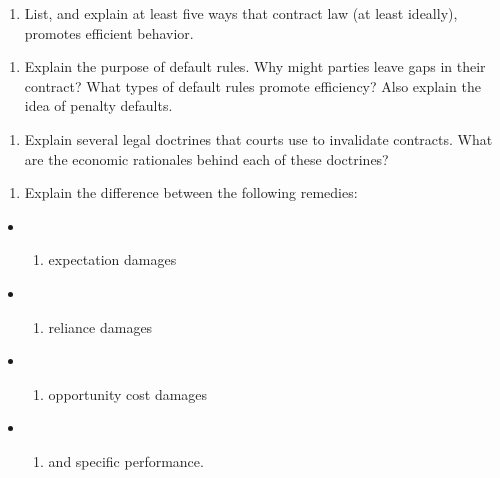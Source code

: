 \documentclass[
  11pt,
]{article}
\providecommand{\tightlist}{%
  \setlength{\itemsep}{0pt}\setlength{\parskip}{0pt}}
\begin{document}
\vspace{3in}

\begin{enumerate}
\def\labelenumi{\arabic{enumi}.}
\setcounter{enumi}{1}
\tightlist
\item
  List, and explain at least five ways that contract law (at least
  ideally), promotes efficient behavior.
\end{enumerate}

\clearpage

\begin{enumerate}
\def\labelenumi{\arabic{enumi}.}
\setcounter{enumi}{2}
\tightlist
\item
  Explain the purpose of default rules. Why might parties leave gaps in
  their contract? What types of default rules promote efficiency? Also
  explain the idea of penalty defaults.
\end{enumerate}

\vspace{3in}

\begin{enumerate}
\def\labelenumi{\arabic{enumi}.}
\setcounter{enumi}{3}
\tightlist
\item
  Explain several legal doctrines that courts use to invalidate
  contracts. What are the economic rationales behind each of these
  doctrines?
\end{enumerate}

\clearpage

\begin{enumerate}
\def\labelenumi{\arabic{enumi}.}
\setcounter{enumi}{4}
\tightlist
\item
  Explain the difference between the following remedies:
\end{enumerate}

\begin{itemize}
\item
  \begin{enumerate}
  \def\labelenumi{(\roman{enumi})}
  \tightlist
  \item
    expectation damages
  \end{enumerate}
\item
  \begin{enumerate}
  \def\labelenumi{(\roman{enumi})}
  \setcounter{enumi}{1}
  \tightlist
  \item
    reliance damages
  \end{enumerate}
\item
  \begin{enumerate}
  \def\labelenumi{(\roman{enumi})}
  \setcounter{enumi}{2}
  \tightlist
  \item
    opportunity cost damages
  \end{enumerate}
\item
  \begin{enumerate}
  \def\labelenumi{(\roman{enumi})}
  \setcounter{enumi}{3}
  \tightlist
  \item
    and specific performance.
  \end{enumerate}
\end{itemize}
\end{document}
